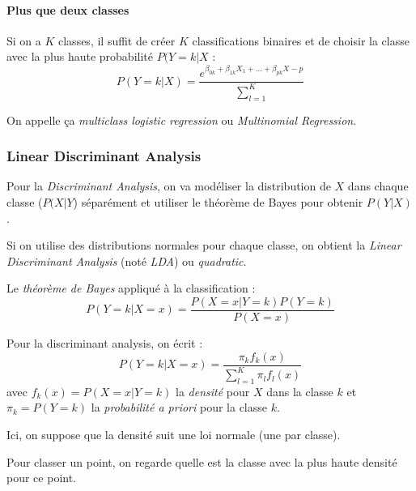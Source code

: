         \paragraph{Plus que deux classes}
        Si on a \(K\) classes, il suffit de créer \(K\) classifications binaires et de choisir la classe avec la plus haute probabilité \(P(Y = k | X\) :
        \[
            P(Y = k | X) = \frac{e^{\beta_{0k} + \beta_{1k}X_1 + \dots + \beta_{pk}X-p}}{\sum_{l=1}^K}
        \]

        On appelle ça \textit{multiclass logistic regression} ou \textit{Multinomial Regression}.

    \subsubsection{Linear Discriminant Analysis}
        \begin{definition}
            Pour la \textit{Discriminant Analysis}, on va modéliser la distribution de \(X\) dans chaque classe (\(P(X | Y\)) séparément et utiliser le théorème de Bayes pour obtenir \(P(Y | X)\).

            Si on utilise des distributions normales pour chaque classe, on obtient la \textit{Linear Discriminant Analysis} (noté \textit{LDA}) ou \textit{quadratic}.
        \end{definition}

        \begin{definition}
            Le \textit{théorème de Bayes} appliqué à la classification :
            \[
                P(Y = k | X = x) = \frac{P(X = x | Y = k)P(Y = k)}{P(X = x)}
            \]
        \end{definition}

        Pour la discriminant analysis, on écrit :
        \[
            P(Y = k | X = x) = \frac{\pi_k f_k(x)}{\sum_{l=1}^K \pi_l f_l(x)}
        \]
        avec \(f_k(x) = P(X = x | Y = k)\) la \textit{densité} pour \(X\) dans la classe \(k\) et \(\pi_k = P(Y = k)\) la \textit{probabilité a priori} pour la classe \(k\).

        Ici, on suppose que la densité suit une loi normale (une par classe).

        Pour classer un point, on regarde quelle est la classe avec la plus haute densité pour ce point.

